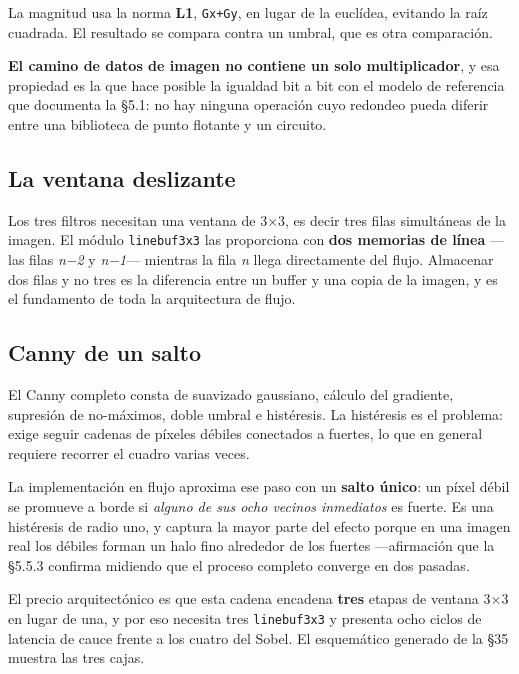 La magnitud usa la norma \textbf{L1},
\texttt{\textbar{}Gx\textbar{}+\textbar{}Gy\textbar{}}, en lugar de la
euclídea, evitando la raíz cuadrada. El resultado se compara contra un
umbral, que es otra comparación.

\textbf{El camino de datos de imagen no contiene un solo multiplicador},
y esa propiedad es la que hace posible la igualdad bit a bit con el
modelo de referencia que documenta la §5.1: no hay ninguna operación
cuyo redondeo pueda diferir entre una biblioteca de punto flotante y un
circuito.

\subsection{La ventana deslizante}\label{la-ventana-deslizante}

Los tres filtros necesitan una ventana de 3×3, es decir tres filas
simultáneas de la imagen. El módulo \texttt{linebuf3x3} las proporciona
con \textbf{dos memorias de línea} ---las filas \emph{n−2} y
\emph{n−1}--- mientras la fila \emph{n} llega directamente del flujo.
Almacenar dos filas y no tres es la diferencia entre un buffer y una
copia de la imagen, y es el fundamento de toda la arquitectura de flujo.

\subsection{Canny de un salto}\label{canny-de-un-salto}

El Canny completo consta de suavizado gaussiano, cálculo del gradiente,
supresión de no-máximos, doble umbral e histéresis. La histéresis es el
problema: exige seguir cadenas de píxeles débiles conectados a fuertes,
lo que en general requiere recorrer el cuadro varias veces.

La implementación en flujo aproxima ese paso con un \textbf{salto
único}: un píxel débil se promueve a borde si \emph{alguno de sus ocho
vecinos inmediatos} es fuerte. Es una histéresis de radio uno, y captura
la mayor parte del efecto porque en una imagen real los débiles forman
un halo fino alrededor de los fuertes ---afirmación que la §5.5.3
confirma midiendo que el proceso completo converge en dos pasadas.

El precio arquitectónico es que esta cadena encadena \textbf{tres}
etapas de ventana 3×3 en lugar de una, y por eso necesita tres
\texttt{linebuf3x3} y presenta ocho ciclos de latencia de cauce frente a
los cuatro del Sobel. El esquemático generado de la §35 muestra las tres
cajas.

